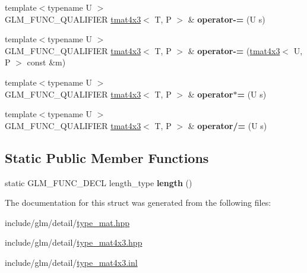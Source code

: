 \begin{DoxyCompactItemize}
\item 
\mbox{\label{structglm_1_1tmat4x3_a07f1856eb5bd526ae5035b9506be5e31}} 
{\footnotesize template$<$typename U $>$ }\\G\+L\+M\+\_\+\+F\+U\+N\+C\+\_\+\+Q\+U\+A\+L\+I\+F\+I\+ER \hyperlink{structglm_1_1tmat4x3}{tmat4x3}$<$ T, P $>$ \& {\bfseries operator-\/=} (U s)
\item 
\mbox{\label{structglm_1_1tmat4x3_a8bfdcb72c5c392609d32e6cb9f312964}} 
{\footnotesize template$<$typename U $>$ }\\G\+L\+M\+\_\+\+F\+U\+N\+C\+\_\+\+Q\+U\+A\+L\+I\+F\+I\+ER \hyperlink{structglm_1_1tmat4x3}{tmat4x3}$<$ T, P $>$ \& {\bfseries operator-\/=} (\hyperlink{structglm_1_1tmat4x3}{tmat4x3}$<$ U, P $>$ const \&m)
\item 
\mbox{\label{structglm_1_1tmat4x3_a29cf84d94484e36a48bc12dd82a92bb8}} 
{\footnotesize template$<$typename U $>$ }\\G\+L\+M\+\_\+\+F\+U\+N\+C\+\_\+\+Q\+U\+A\+L\+I\+F\+I\+ER \hyperlink{structglm_1_1tmat4x3}{tmat4x3}$<$ T, P $>$ \& {\bfseries operator$\ast$=} (U s)
\item 
\mbox{\label{structglm_1_1tmat4x3_ab1383b67bc01f049a43804b2253384b9}} 
{\footnotesize template$<$typename U $>$ }\\G\+L\+M\+\_\+\+F\+U\+N\+C\+\_\+\+Q\+U\+A\+L\+I\+F\+I\+ER \hyperlink{structglm_1_1tmat4x3}{tmat4x3}$<$ T, P $>$ \& {\bfseries operator/=} (U s)
\end{DoxyCompactItemize}
\subsection*{Static Public Member Functions}
\begin{DoxyCompactItemize}
\item 
\mbox{\label{structglm_1_1tmat4x3_aba1f214b7f592a7006c5c53df07e6081}} 
static G\+L\+M\+\_\+\+F\+U\+N\+C\+\_\+\+D\+E\+CL length\+\_\+type {\bfseries length} ()
\end{DoxyCompactItemize}


The documentation for this struct was generated from the following files\+:\begin{DoxyCompactItemize}
\item 
include/glm/detail/\hyperlink{type__mat_8hpp}{type\+\_\+mat.\+hpp}\item 
include/glm/detail/\hyperlink{type__mat4x3_8hpp}{type\+\_\+mat4x3.\+hpp}\item 
include/glm/detail/\hyperlink{type__mat4x3_8inl}{type\+\_\+mat4x3.\+inl}\end{DoxyCompactItemize}
